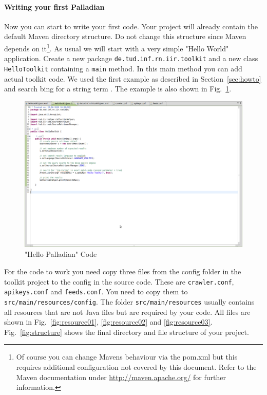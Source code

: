 \documentclass[a4paper,twoside]{book}      %
\begin{document}
\paragraph{Writing your first Palladian} Now you can start to write your first code. Your project will already contain the default Maven directory structure. Do not change this structure since Maven depends on it\footnote{Of course you can change Mavens behaviour via the pom.xml but this requires additional configuration not covered by this document. Refer to the Maven documentation under \url{http://maven.apache.org/} for further information.}. As usual we will start with a very simple "Hello World" application. Create a new package \texttt{de.tud.inf.rn.iir.toolkit} and a new class \texttt{HelloToolkit} containing a \texttt{main} method. In this main method you can add actual toolkit code. We used the first example as described in Section~\ref{sec:howto} and search bing for a string term . The example is also shown in Fig.~\ref{fig:hellotoolkit}.
\begin{figure}
\centering
\includegraphics[trim=0 350px 600px 0,clip=true,width=\textwidth]{img/ht10.png}
\caption{"Hello Palladian" Code}
\label{fig:hellotoolkit}
\end{figure}
For the code to work you need copy three files from the config folder in the toolkit project to the config in the source code. These are \texttt{crawler.conf}, \texttt{apikeys.conf} and \texttt{feeds.conf}. You need to copy them to \texttt{src/main/resources/config}. The folder \texttt{src/main/resources} usually contains all resources that are not Java files but are required by your code. All files are shown in Fig.~\ref{fig:resource01}, \ref{fig:resource02} and \ref{fig:resource03}. Fig.~\ref{fig:structure} shows the final directory and file structure of your project.
\end{document}
